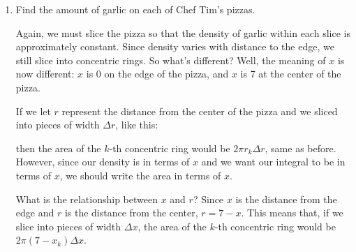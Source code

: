 \documentclass{article}
\begin{document}
\begin{enumerate}
\begin{enumerate}
  \item
    \begin{problem}[\vfill]
      Find the amount of garlic on each of Chef Tim's pizzas.      
    \end{problem}

    \begin{solution}
      Again, we must slice the pizza so that the density of garlic within
      each slice is approximately constant.  Since density varies with
      distance to the edge, we still slice into concentric rings.  So
      what's different?  Well, the meaning of $x$ is now different: $x$ is
      0 on the edge of the pizza, and $x$ is 7 at the center of the pizza.

     If we let $r$ represent the distance from the center of the pizza and we sliced into pieces of width $\Delta r$,
     like this:
      \begin{center}
      \end{center}
      then the area of the $k$-th concentric ring would be $2\pi r_k\Delta r$,
      same as before. However, since our density is in terms of $x$ and we want 
      our
      integral to be in terms of $x$, we should write the area in terms of $x$.

      What is the relationship between $x$ and $r$? Since $x$ is the distance
      from the edge and $r$ is the distance from the center, $r=7-x$.
      This means that, if we slice into pieces of width $\Delta x$, the area of the $k$-th concentric ring
      would be $2\pi(7- x_k)\Delta x$. 
      

\end{solution}
\end{enumerate}
\end{enumerate}
\end{document}
